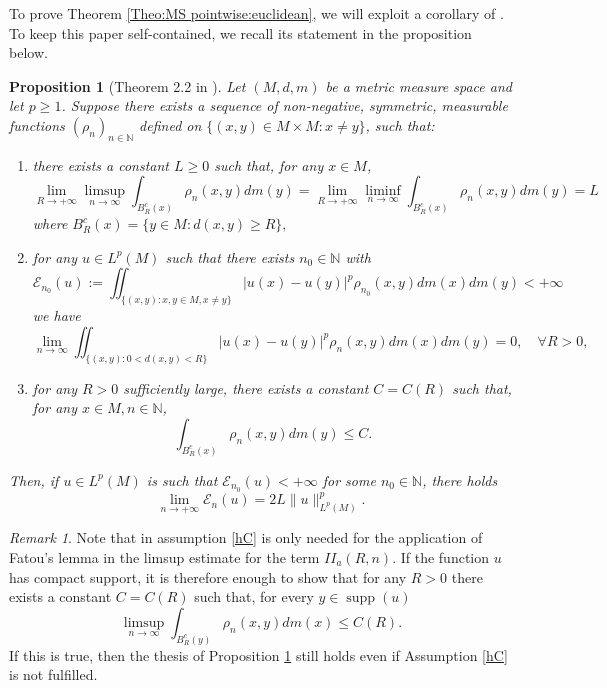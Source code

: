 \documentclass[reqno,11pt]{amsart}
\numberwithin{equation}{section}
\theoremstyle{definition} %
\theoremstyle{plain}
\newtheorem{prop}[prop]{Proposition}
\theoremstyle{definition}
\theoremstyle{remark}
\newtheorem{remark}[remark]{Remark}
\def\N{\mathbb{N}}
\DeclareMathOperator{\supp}{supp}
\begin{document}
To prove Theorem \ref{Theo:MS pointwise:euclidean}, we will exploit a corollary of \cite[Proof of Theorem 2.2]{HanPinamontiXu2025}. To keep this paper self-contained, we recall its statement in the proposition below.

\begin{prop}[Theorem 2.2 in \cite{HanPinamontiXu2025}]
\label{prop:HanPinamonti}
    Let $(M, {d}, {m})$ be a metric measure space and let \mbox{$p\geq 1$}. Suppose there exists a sequence of non-negative, symmetric, measurable functions $\left(\rho_n\right)_{n \in \mathbb{N}}$ defined on $\{(x, y) \in M \times M: x \neq y\}$, such that:
    \begin{enumerate}[label=\Alph*)]
    \item \label{hA} there exists a constant $L \geq 0$ such that, for any $x \in M$,
    $$
    \lim _{R \rightarrow+\infty} \limsup_{n \rightarrow \infty} \int_{B_R^c(x)} \rho_n(x, y) {dm}(y)=\lim _{R \rightarrow+\infty} \liminf_{n \rightarrow \infty} \int_{B_R^c(x)} \rho_n(x, y) {dm}(y)=L
    $$
    where $B_R^c(x)=\{y \in M: {d}(x, y) \geq R\},$
    \item \label{hB} for any $u \in L^p(M)$ such that there exists $n_0 \in \mathbb{N}$ with
    $$
    \mathcal{E}_{n_0}(u):=\iint_{\{(x, y): x, y \in M, x \neq y\}}|u(x)-u(y)|^p \rho_{n_0}(x, y) dm(x) dm(y)<+\infty
    $$
    we have
    $$
    \lim _{n \rightarrow \infty} \iint_{\{(x, y): 0<{d}(x, y)<R\}}|u(x)-u(y)|^p \rho_n(x, y) dm(x) dm(y)=0, \quad \forall R>0,
    $$
    \item \label{hC} for any $R>0$ sufficiently large, there exists a constant $C=C(R)$ such that, for any $x \in M, n \in \mathbb{N}$,
    $$
    \int_{B_R^c(x)} \rho_n(x, y) {dm}(y) \leq C.
    $$
    \end{enumerate}
    Then, if $u\in L^p(M)$ is such that $\mathcal{E}_{n_0}(u)<+\infty$ for some $n_0\in \N$, there holds
    $$\lim_{n\to +\infty}\mathcal{E}_{n}(u)=2L\|u\|_{L^p(M)}^p.$$
\end{prop}
\begin{remark}
    \label{rem:CweakHanPinam}
    Note that in \cite[Proof of Theorem 2.2]{HanPinamontiXu2025} assumption \ref{hC} is only needed for the application of Fatou's lemma in the limsup estimate for the term $II_a(R,n)$. If the function $u$ has compact support, it is therefore enough to  show that for any $R>0$ there exists a constant $C=C(R)$ such that, for every $y\in \supp (u)$
    \begin{equation}
        \limsup_{n\to \infty}\int_{B_R^c(y)}\rho_n(x,y)dm(x) \leq C(R).
    \end{equation}
    If this is true, then the thesis of Proposition \ref{prop:HanPinamonti} still holds even if Assumption \ref{hC} is not fulfilled.
\end{remark}
\end{document}
